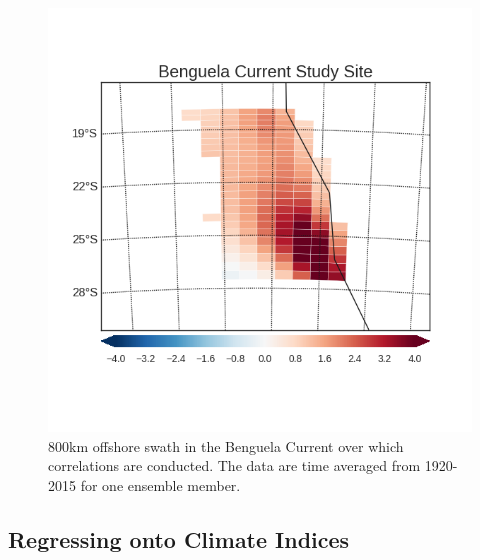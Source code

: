 \documentclass[12pt]{article}
\begin{document}
\begin{figure}[!h]
	\centering
	\includegraphics[width=\linewidth]{../../figs/bencs/study-site/benguela-current-study-site.png}
	\caption{800km offshore swath in the Benguela Current over which correlations are conducted. The data are time averaged from 1920-2015 for one ensemble member.}
	\label{fig:ben-study-site}
\end{figure}

\subsection{Regressing onto Climate Indices}
\end{document}
